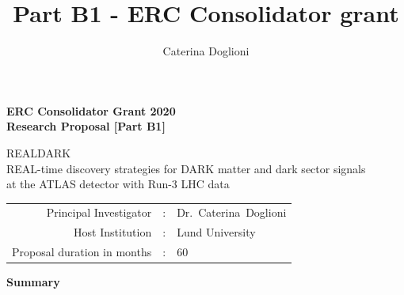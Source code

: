 \documentclass[11pt,a4paper]{article}
\title{{\Large Part B1 - ERC Consolidator grant}}
\author{{\normalsize Caterina Doglioni}}
\date{}                                           %
\begin{document}
\begin{center} 

{\Large\bf ERC Consolidator Grant 2020} \\
	{\Large\bf Research Proposal [Part B1]}  \\
 
\vspace{2cm} 
{\huge {\bf }}   \smallskip  

\vspace{2cm} 
{\Huge{REALDARK}} \\
\medskip  
{\large{REAL-time discovery strategies for DARK matter and dark sector signals \\ at the ATLAS detector with Run-3 LHC data}} \\ 

\vspace{1cm} 
\vspace{1cm}
\end{center} 
\begin{tabular}{rcl}
Principal Investigator & : & Dr.~Caterina~Doglioni \\
Host Institution & : & Lund University \\ 
Proposal duration in months & : & 60 \\
\end{tabular}  
\vspace{2cm}


\begin{center} {\bf Summary}  \end{center}
\end{document}
